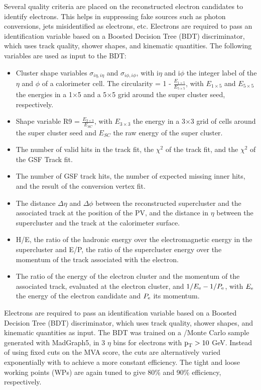 Several quality criteria are placed on the reconstructed electron candidates to identify electrons. This helps in suppressing fake sources such as photon conversions, jets misidentified as electrons, etc. Electrons are required to pass an identification variable based on a Boosted Decision Tree (BDT) discriminator, which uses track quality, shower shapes, and kinematic quantities. The following variables are used as input to the BDT:
\begin{itemize}
  \item Cluster shape variables $\sigma_{i\eta,i\eta}$ and $\sigma_{i\phi,i\phi}$, with i$\eta$ and i$\phi$ the integer label of the $\eta$ and $\phi$ of a calorimeter cell. The circularity = 1 - $\frac{E_{1 \times 5}}{E_{5 \times 5}}$, with $E_{1 \times 5}$ and $E_{5 \times 5}$ the energies in a 1$\times$5 and a 5$\times$5 grid around the super cluster seed, respectively.
  \item Shape variable R9 = $\frac{E_{3 \times 3}}{E_{SC}}$, with $E_{3 \times 3}$ the energy in a 3$\times$3 grid of cells around the super cluster seed and $E_{SC}$ the raw energy of the super cluster.
  \item The number of valid hits in the track fit, the $\chi^{2}$ of the track fit, and the $\chi^{2}$ of the GSF Track fit.
  \item The number of GSF track hits, the number of expected missing inner hits, and the result of the conversion vertex fit.
  \item The distance $\Delta \eta$ and $\Delta \phi$ between the reconstructed supercluster and the associated track at the position of the PV, and the distance in $\eta$ between the supercluster and the track at the calorimeter surface.
  \item H/E, the ratio of the hadronic energy over the electromagnetic energy in the supercluster and E/P, the ratio of the supercluster energy over the momentum of the track associated with the electron.
  \item The ratio of the energy of the electron cluster and the momentum of the associated track, evaluated at the electron cluster, and $1/E_{\text{e}} - 1/P_{\text{e}}$, with $E_{\text{e}}$ the energy of the electron candidate and $P_{\text{e}}$ its momentum.
\end{itemize}

Electrons are required to pass an identification variable based on a Boosted Decision Tree (BDT) discriminator, which uses track quality, shower shapes, and kinematic quantities as input. The BDT was trained on a \PZ/\Pgg Monte Carlo sample generated with MadGraph5, in 3 $\eta$ bins for electrons with $\text{p}_\text{T} > 10$ GeV. Instead of using fixed cuts on the MVA score, the cuts are alternatively varied exponentially with \pt to achieve a more constant efficiency. The tight and loose working points (WPs) are again tuned to give 80\% and 90\% efficiency, respectively.

